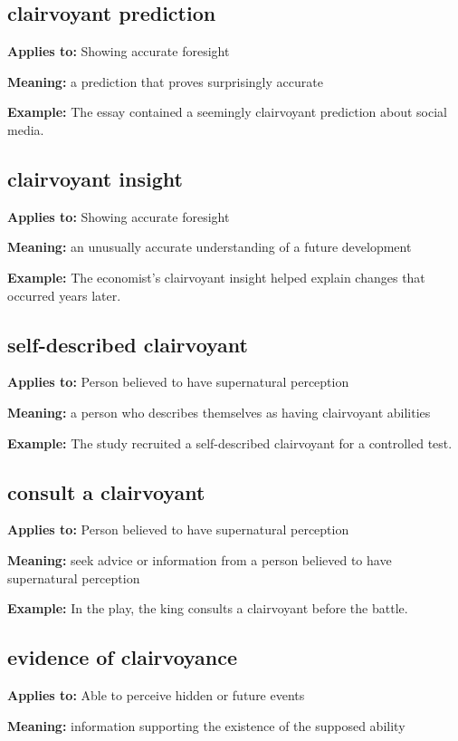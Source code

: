 \documentclass[11pt]{article}
\begin{document}
\subsection{clairvoyant prediction}
\textbf{Applies to:} Showing accurate foresight

\textbf{Meaning:} a prediction that proves surprisingly accurate

\textbf{Example:} The essay contained a seemingly clairvoyant prediction about social media.

\subsection{clairvoyant insight}
\textbf{Applies to:} Showing accurate foresight

\textbf{Meaning:} an unusually accurate understanding of a future development

\textbf{Example:} The economist's clairvoyant insight helped explain changes that occurred years later.

\subsection{self-described clairvoyant}
\textbf{Applies to:} Person believed to have supernatural perception

\textbf{Meaning:} a person who describes themselves as having clairvoyant abilities

\textbf{Example:} The study recruited a self-described clairvoyant for a controlled test.

\subsection{consult a clairvoyant}
\textbf{Applies to:} Person believed to have supernatural perception

\textbf{Meaning:} seek advice or information from a person believed to have supernatural perception

\textbf{Example:} In the play, the king consults a clairvoyant before the battle.

\subsection{evidence of clairvoyance}
\textbf{Applies to:} Able to perceive hidden or future events

\textbf{Meaning:} information supporting the existence of the supposed ability
\end{document}

